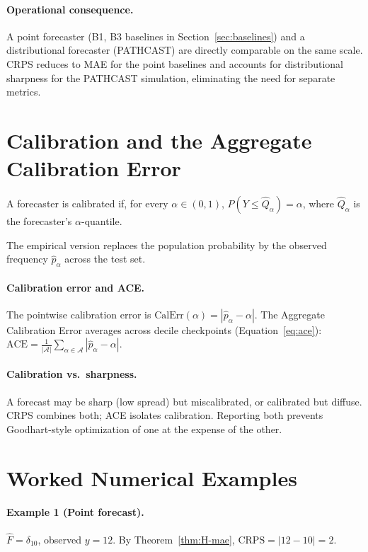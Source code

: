 \paragraph{Operational consequence.} A point forecaster (B1, B3 baselines
in Section~\ref{sec:baselines}) and a distributional forecaster
(PATHCAST) are directly comparable on the same scale. CRPS reduces to MAE
for the point baselines and accounts for distributional sharpness for the
PATHCAST simulation, eliminating the need for separate metrics.


\section{Calibration and the Aggregate Calibration Error}
\label{app:H-calibration}

\begin{definition}[Calibration]
A forecaster is calibrated if, for every $\alpha \in (0, 1)$,
$P(Y \leq \hat{Q}_\alpha) = \alpha$, where $\hat{Q}_\alpha$ is the
forecaster's $\alpha$-quantile.
\end{definition}

The empirical version replaces the population probability by the observed
frequency $\hat{p}_\alpha$ across the test set.

\paragraph{Calibration error and ACE.} The pointwise calibration error
is $\mathrm{CalErr}(\alpha) = |\hat{p}_\alpha - \alpha|$. The Aggregate
Calibration Error averages across decile checkpoints
(Equation~\ref{eq:ace}):
$\mathrm{ACE} = \frac{1}{|\mathcal{A}|} \sum_{\alpha \in \mathcal{A}}
|\hat{p}_\alpha - \alpha|$.

\paragraph{Calibration vs.\ sharpness.} A forecast may be sharp (low
spread) but miscalibrated, or calibrated but diffuse. CRPS combines both;
ACE isolates calibration. Reporting both prevents Goodhart-style
optimization of one at the expense of the other.


\section{Worked Numerical Examples}
\label{app:H-examples}

\paragraph{Example 1 (Point forecast).} $\hat{F} = \delta_{10}$, observed
$y = 12$. By Theorem~\ref{thm:H-mae}, $\mathrm{CRPS} = |12 - 10| = 2$.

